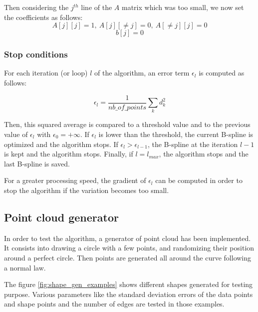 \documentclass{article}
\newcommand{\vsp}{\vspace{\baselineskip}}
\begin{document}
Then considering the $j^{th}$ line of the $A$ matrix which was too small, we now set the coefficients as follows:
$$ A[j][j] = 1,\ A[j][\neq j] = 0,\ A[\neq j][j] = 0 $$
$$ b[j] = 0 $$

\subsubsection{Stop conditions} \label{sec:stop_condition}

For each iteration (or loop) $l$ of the algorithm, an error term $\epsilon_l$ is computed as follows:

\begin{equation}
    \epsilon_l = \frac{1}{nb\_of\_points}\sum_k d_k^2
\end{equation}

Then, this squared average is compared to a threshold value and to the previous value of $\epsilon_l$ with $\epsilon_0 = +\infty$. If $\epsilon_l$ is lower than the threshold, the current B-spline is optimized and the algorithm stops. If $\epsilon_l > \epsilon_{l-1}$, the B-spline at the iteration $l-1$ is kept and the algorithm stops. Finally, if $l = l_{max}$, the algorithm stops and the last B-spline is saved.

\vsp

For a greater processing speed, the gradient of $\epsilon_l$ can be computed in order to stop the algorithm if the variation becomes too small.

\subsection{Point cloud generator}

In order to test the algorithm, a generator of point cloud has been implemented. It consists into drawing a circle with a few points, and randomizing their position around a perfect circle. Then points are generated all around the curve following a normal law.

\vsp

The figure \ref{fig:shape_gen_examples} shows different shapes generated for testing purpose. Various parameters like the standard deviation errors of the data points and shape points and the number of edges are tested in those examples. 
\end{document}
